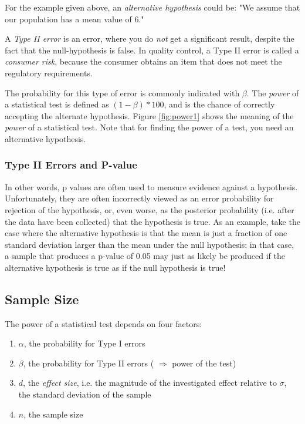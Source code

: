 For the example given above, an \emph{alternative hypothesis} could be: "We assume that our population has a mean value of 6."

A \emph{Type II error} is an error, where you do \emph{not} get a significant result, despite the fact that the null-hypothesis is false.  In quality control, a Type II error is called a \emph{consumer risk}, because the consumer obtains an item that does not meet the regulatory requirements.

The probability for this type of error is commonly indicated with $\beta$. The \emph{power} of a statistical test is defined as $(1-\beta)*100$, and is the chance of correctly accepting the alternate hypothesis. Figure \ref{fig:power1} shows the meaning of the \emph{power} of a statistical test. Note that for finding the power of a test, you need an alternative hypothesis.

\subsubsection{Type II Errors and P-value}

In other words, p values are often used to measure evidence against a hypothesis. Unfortunately, they are often incorrectly viewed as an error probability for rejection of the hypothesis, or, even worse, as the posterior probability (i.e. after the data have been collected) that the hypothesis is true. As an example, take the case where the alternative hypothesis is that the mean is just a fraction of one standard deviation larger than the mean under the null hypothesis: in that case, a sample that produces a p-value of 0.05 may just as likely be produced if the alternative hypothesis is true as if the null hypothesis is true!

\subsection{Sample Size}
The power of a statistical test depends on four factors:

\begin{enumerate}
  \item  $\alpha$, the probability for Type I errors
  \item  $\beta$, the probability for Type II errors ( $\Rightarrow$ power of the test)
  \item  $d$, the \emph{effect size}, i.e. the magnitude of the investigated effect relative to $\sigma$, the standard deviation of the sample
  \item  $n$, the sample size
\end{enumerate}

